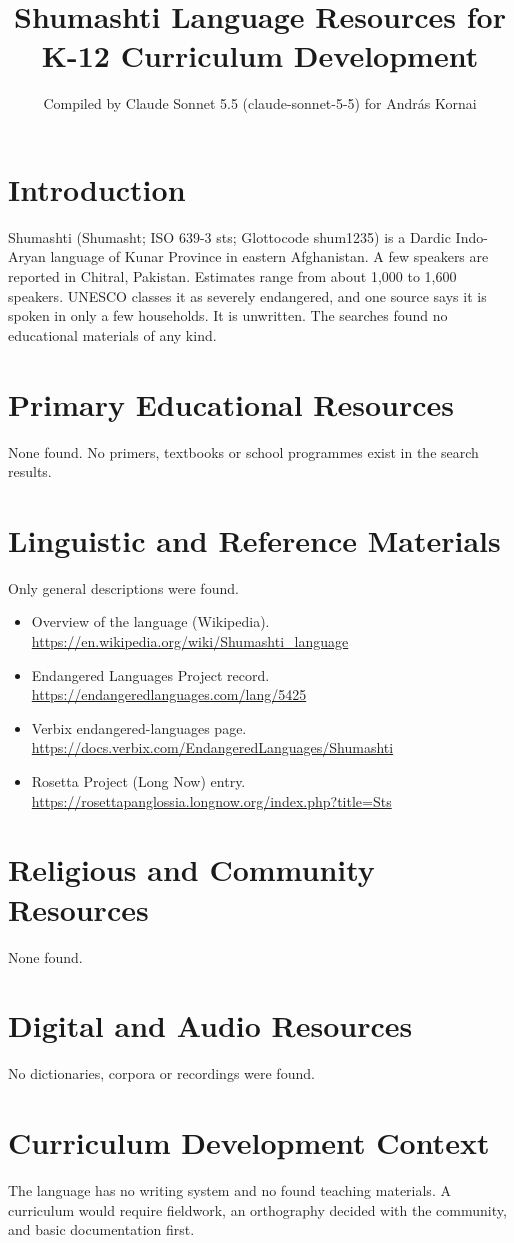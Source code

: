 \documentclass[12pt]{article}
\title{Shumashti Language Resources for K-12 Curriculum Development}
\author{Compiled by Claude Sonnet 5.5 (claude-sonnet-5-5) for Andr\'as Kornai}
\date{}
\begin{document}
\maketitle

\section{Introduction}
Shumashti (Shumasht; ISO 639-3 sts; Glottocode shum1235) is a Dardic Indo-Aryan language of Kunar Province in eastern Afghanistan. A few speakers are reported in Chitral, Pakistan. Estimates range from about 1,000 to 1,600 speakers. UNESCO classes it as severely endangered, and one source says it is spoken in only a few households. It is unwritten. The searches found no educational materials of any kind.

\section{Primary Educational Resources}
None found. No primers, textbooks or school programmes exist in the search results.

\section{Linguistic and Reference Materials}
Only general descriptions were found.
\begin{itemize}
\item Overview of the language (Wikipedia). \url{https://en.wikipedia.org/wiki/Shumashti_language}
\item Endangered Languages Project record. \url{https://endangeredlanguages.com/lang/5425}
\item Verbix endangered-languages page. \url{https://docs.verbix.com/EndangeredLanguages/Shumashti}
\item Rosetta Project (Long Now) entry. \url{https://rosettapanglossia.longnow.org/index.php?title=Sts}
\end{itemize}

\section{Religious and Community Resources}
None found.

\section{Digital and Audio Resources}
No dictionaries, corpora or recordings were found.

\section{Curriculum Development Context}
The language has no writing system and no found teaching materials. A curriculum would require fieldwork, an orthography decided with the community, and basic documentation first.
\end{document}
